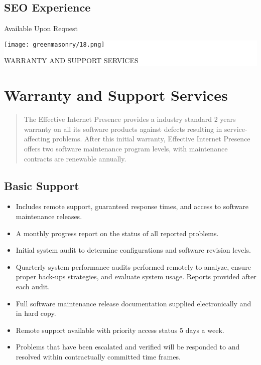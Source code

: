 \documentclass[35pt]{report}
\begin{document}
		\section{SEO Experience}
		Available Upon Request
	
\clearpage

\thispagestyle{empty}

\vspace*{2cm}
\colorbox{white}{
	\parbox[t]{1.0\linewidth}{
       	\begin{center} 
			\fontsize{40pt}{11pt}\selectfont 
			\vspace*{.5cm}
				{\texttt{[image: greenmasonry/18.png]}}
				{WARRANTY AND SUPPORT SERVICES \par}
			\vspace*{.5cm}
		\end{center}
	}
}

\clearpage

\normalsize

	\chapter{Warranty and Support Services}
		\begin{quote}
		The Effective Internet Presence provides a industry standard 2 years warranty on all its software products against defects resulting in service-affecting problems. After this initial warranty, Effective Internet Presence offers two software maintenance program levels, with maintenance contracts are renewable annually.
		\end{quote}

		\section{Basic Support}

		\begin{itemize}
		\item Includes remote support, guaranteed response times, and access to software maintenance releases.
		\item A monthly progress report on the status of all reported problems.
		\item Initial system audit to determine configurations and software revision levels.
		\item Quarterly system performance audits performed remotely to analyze, ensure proper back-ups strategies, and evaluate system usage. Reports provided after each audit.
		\item Full software maintenance release documentation supplied electronically and in hard copy.
		\item Remote support available with priority access status 5 days a week.
		\item Problems that have been escalated and verified will be responded to and resolved within contractually committed time frames.
		\end{itemize}
\end{document}

